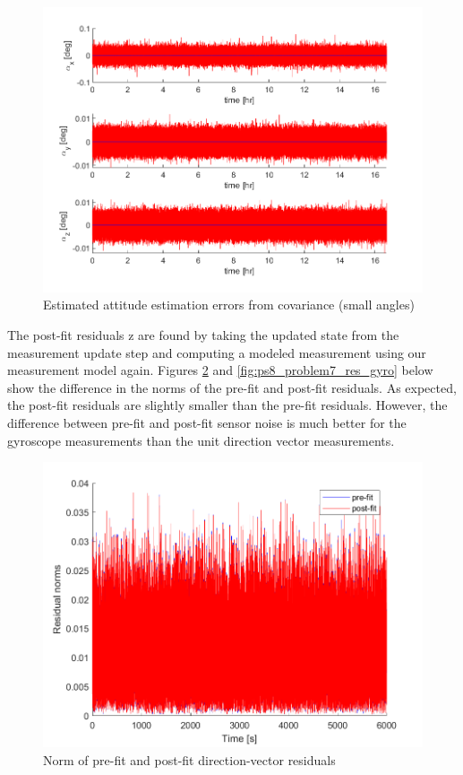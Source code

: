 \begin{figure}[H]
\centering
\includegraphics[scale=0.8]{Images/ps8_problem7_covComp.png}
\caption{Estimated attitude estimation errors from covariance (small angles)}
\label{fig:ps8_problem7_covComp}
\end{figure}

The post-fit residuals z are found by taking the updated state from the measurement update step and computing a modeled measurement using our measurement model again. Figures \ref{fig:ps8_problem7_res_units} and \ref{fig:ps8_problem7_res_gyro} below show the difference in the norms of the pre-fit and post-fit residuals. As expected, the post-fit residuals are slightly smaller than the pre-fit residuals. However, the difference between pre-fit and post-fit sensor noise is much better for the gyroscope measurements than the unit direction vector measurements.

\begin{figure}[H]
\centering
\includegraphics[scale=0.8]{Images/ps8_problem7_res_units.png}
\caption{Norm of pre-fit and post-fit direction-vector residuals}
\label{fig:ps8_problem7_res_units}
\end{figure}

